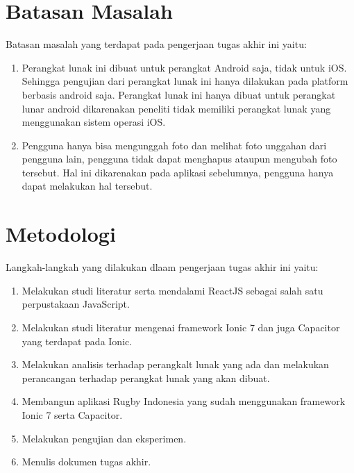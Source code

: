 
\section{Batasan Masalah}
\label{sec:batasan}
Batasan masalah yang terdapat pada pengerjaan tugas akhir ini yaitu:
\begin{enumerate}
    \item Perangkat lunak ini dibuat untuk perangkat Android saja, tidak untuk iOS. Sehingga pengujian dari perangkat lunak ini hanya dilakukan pada platform berbasis android saja. Perangkat lunak ini hanya dibuat untuk perangkat lunar android dikarenakan peneliti tidak memiliki perangkat lunak yang menggunakan sistem operasi iOS.
    \item Pengguna hanya bisa mengunggah foto dan melihat foto unggahan dari pengguna lain, pengguna tidak dapat menghapus ataupun mengubah foto tersebut. Hal ini dikarenakan pada aplikasi sebelumnya, pengguna hanya dapat melakukan hal tersebut.
\end{enumerate}


\section{Metodologi}
\label{sec:metlit}
Langkah-langkah yang dilakukan dlaam pengerjaan tugas akhir ini yaitu:
\begin{enumerate}
    \item Melakukan studi literatur serta mendalami ReactJS sebagai salah satu perpustakaan JavaScript.
    \item Melakukan studi literatur mengenai framework Ionic 7 dan juga Capacitor yang terdapat pada Ionic.
    \item Melakukan analisis terhadap perangkalt lunak yang ada dan melakukan perancangan terhadap perangkat lunak yang akan dibuat.
    \item Membangun aplikasi Rugby Indonesia yang sudah menggunakan framework Ionic 7 serta Capacitor.
    \item Melakukan pengujian dan eksperimen.
    \item Menulis dokumen tugas akhir.
\end{enumerate}


